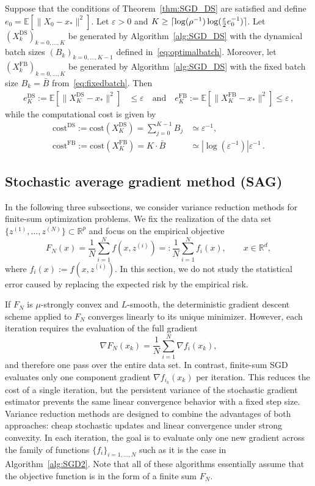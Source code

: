 \documentclass[12pt,openany]{book}
\theoremstyle{definition}
\theoremstyle{definition}
\newcommand{\E}{\mathbb{E}}
\newcommand{\R}{\mathbb{R}}
\DeclarePairedDelimiter\ceil{\lceil}{\rceil}
\begin{document}
\begin{thm}
Suppose that the conditions of Theorem~\ref{thm:SGD_DS} are satisfied and define $e_0 = \E[\|X_0-x_\ast\|^2]$. Let $\varepsilon>0$ and $K\ge\ceil{\log(\rho^{-1})\log(\frac{\varepsilon}2e_0^{-1})}$. Let $(X_k^{\mathrm{DS}})_{k=0,\dots,K}$ be generated by Algorithm~\ref{alg:SGD_DS} with the dynamical batch sizes
$(B_k)_{k=0,\dots,K-1}$ defined in~\eqref{eq:optimalbatch}. Moreover, let
$(X_k^{\mathrm{FB}})_{k=0,\dots,K}$ be generated by Algorithm~\ref{alg:SGD_DS} with the fixed batch size $B_k=\bar B$ from~\eqref{eq:fixedbatch}.
Then
\begin{align*}
e_K^{\mathrm{DS}} := \E[\|X_K^{\mathrm{DS}}-x_\ast\|^2] &\le \varepsilon\quad \text{and}\quad 
e_K^{\mathrm{FB}} := \E[\|X_K^{\mathrm{FB}}-x_\ast\|^2] \le \varepsilon\,,
\end{align*}
while the computational cost is given by
\begin{align*}
{\mathrm{cost}}^{\mathrm{DS}} := {\mathrm{cost}}(X_K^{\mathrm{DS}}) = \sum_{j=0}^{K-1}B_j &\simeq \varepsilon^{-1},\\
{\mathrm{cost}}^{\mathrm{FB}} := {\mathrm{cost}}(X_K^{\mathrm{FB}}) = K\cdot \bar B &\simeq |\log(\varepsilon^{-1})|\varepsilon^{-1}\,.
\end{align*}
\end{thm}


\subsection{Stochastic average gradient method (SAG)}

In the following three subsections, we consider variance reduction methods for finite-sum optimization problems. We fix the realization of the data set \(\{z^{(1)},\dots,z^{(N)}\}\subset\R^p\) and focus on the empirical objective
\[
F_N(x)=\frac1N\sum_{i=1}^N f(x,z^{(i)})
=:\frac1N\sum_{i=1}^N f_i(x),
\qquad x\in\R^d,
\]
where $f_i(x):=f(x,z^{(i)})$. In this section, we do not study the statistical error caused by replacing the expected risk by the empirical risk.

If $F_N$ is $\mu$-strongly convex and $L$-smooth, the deterministic gradient descent scheme applied to $F_N$ converges linearly to its unique minimizer. However, each iteration requires the evaluation of the full gradient
\[\nabla F_N(x_k)=\frac1N\sum_{i=1}^N\nabla f_i(x_k),\]
and therefore one pass over the entire data set. In contrast, finite-sum SGD evaluates only one component gradient $\nabla f_{i_k}(x_k)$ per iteration. This reduces the cost of a single iteration, but the persistent variance of the stochastic
gradient estimator prevents the same linear convergence behavior with a fixed step size. Variance reduction methods are designed to combine the advantages of both approaches: cheap stochastic updates and linear convergence under strong convexity.
In each iteration, the goal is to evaluate only one new gradient across the family of functions $\{f_i\}_{i=1,\dots,N}$ such as it is the case in Algorithm~\ref{alg:SGD2}. Note that all of these algorithms essentially assume that the objective function is in the form of a finite sum $F_N$. 
\end{document}
